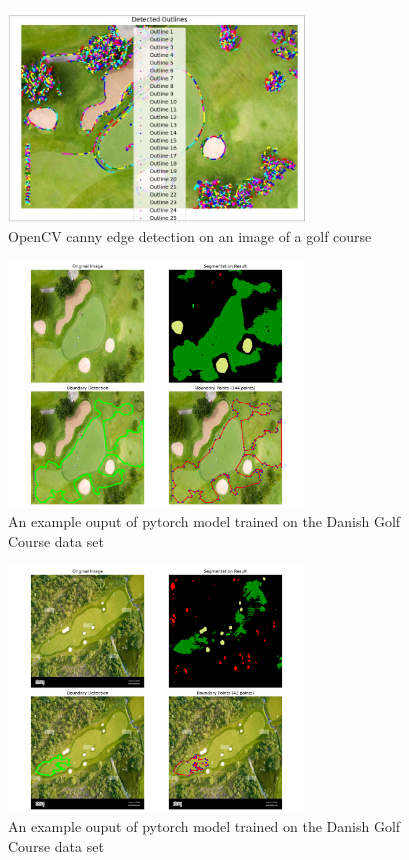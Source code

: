 \documentclass[final]{cmpreport_02}
\begin{document}
\begin{figure}[h!]
	\centering
	\includegraphics[width=0.7\textwidth]{./images/openCvCannyGolfCourse.png}
	\caption{OpenCV canny edge detection on an image of a golf course}
	\label{am:CannyGolfCourse}
\end{figure}

\begin{figure}[h!]
	\centering
	\includegraphics[width=0.7\textwidth]{./images/AdobeGolf_visualisation.png}
	\caption{An example ouput of pytorch model trained on the Danish Golf Course data set}
	\label{am:AGDanish}
\end{figure}

\begin{figure}[h!]
	\centering
	\includegraphics[width=0.7\textwidth]{./images/overheadGolfCourse_visualisation.png}
	\caption{An example ouput of pytorch model trained on the Danish Golf Course data set}
	\label{am:ohGCDanish}
\end{figure}
\end{document}

